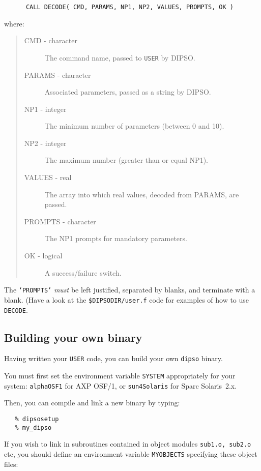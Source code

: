 \documentclass[twoside,11pt]{article}
\renewcommand{\_}{\texttt{\symbol{95}}}
\begin{document}
\begin{verbatim}
      CALL DECODE( CMD, PARAMS, NP1, NP2, VALUES, PROMPTS, OK )
\end{verbatim}

where:

\begin{quote}
\begin{description}
\item [CMD - character] The command name, passed to {\tt{USER}}  by DIPSO.
\item [PARAMS - character]  Associated parameters, passed as a string by
DIPSO.
\item [NP1 - integer] The minimum number of parameters (between 0 and 10).
\item [NP2 - integer] The maximum number (greater than or equal NP1).
\item [VALUES - real] The array into which real values, decoded from PARAMS,
are passed.
\item [PROMPTS - character] The NP1 prompts for mandatory parameters.
\item [OK - logical] A success/failure switch.
\end{description}
\end{quote}

The {\tt{`PROMPTS'}}  {\em must} be left justified, separated by blanks,
and terminate with a blank. (Have a look at the
{\tt{\$DIPSODIR/user.f}}  code for examples of how to use {\tt{DECODE}}. 

\subsection {\label{SEC:MY_DIPSO}Building your own binary}

Having written your {\tt{USER}}  code, you can build your own {\tt{dipso}} 
binary.

You must first set the environment variable {\tt{SYSTEM}}  appropriately
for your system: {\tt{alpha\_OSF1}}  for AXP OSF/1, or {\tt{sun4\_Solaris}}  for
Sparc Solaris~2.x. 

Then, you can compile and link a new binary by typing:

\begin{verbatim}
   % dipsosetup
   % my_dipso
\end{verbatim}

If you wish to link in subroutines contained in object modules {\tt{sub1.o,} 
sub2.o} etc, you should define an environment variable {\tt{MY\_OBJECTS}} 
specifying these object files:
\end{document}
